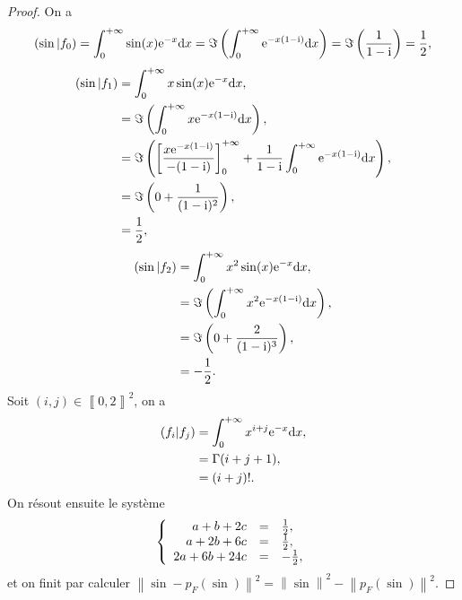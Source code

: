 \documentclass[12pt]{article}
\begin{document}
\begin{proof}
	On a 
	\begin{equation}
		(\sin|f_0)=\int_{0}^{+\infty}\sin(x)\mathrm{e}^{-x}\mathrm{d} x=\Im\left(\int_{0}^{+\infty}\mathrm{e}^{-x(1-\mathrm{i})}\mathrm{d} x\right)=\Im\left(\frac{1}{1-\mathrm{i}}\right)=\frac{1}{2},
	\end{equation}
	\begin{align}
		(\sin|f_1)
		&=\int_{0}^{+\infty}x\sin(x)\mathrm{e}^{-x}\mathrm{d} x,\\
		&=\Im\left(\int_{0}^{+\infty}x\mathrm{e}^{-x(1-\mathrm{i})}\mathrm{d} x\right),\\
		&=\Im\left(\left[\frac{x\mathrm{e}^{-x(1-\mathrm{i})}}{-(1-\mathrm{i})}\right]_{0}^{+\infty}+\frac{1}{1-\mathrm{i}}\int_{0}^{+\infty}\mathrm{e}^{-x(1-\mathrm{i})}\mathrm{d} x\right),\\
		&=\Im\left(0+\frac{1}{(1-\mathrm{i})^{2}}\right),\\
		&=\frac{1}{2},
	\end{align}
	\begin{align}
		(\sin|f_2)
		&=\int_{0}^{+\infty}x^{2}\sin(x)\mathrm{e}^{-x}\mathrm{d} x,\\
		&=\Im\left(\int_{0}^{+\infty}x^{2}\mathrm{e}^{-x(1-\mathrm{i})}\mathrm{d} x\right),\\
		&=\Im\left(0+\frac{2}{(1-\mathrm{i})^{3}}\right),\\
		&=-\frac{1}{2}.
	\end{align}
	Soit $(i,j)\in\left\llbracket0,2\right\rrbracket^{2}$, on a 
	\begin{align}
		(f_i|f_j)
		&=\int_{0}^{+\infty}x^{i+j}\mathrm{e}^{-x}\mathrm{d} x,\\
		&=\Gamma(i+j+1),\\
		&=(i+j)!.
	\end{align}
	On résout ensuite le système 
	\begin{equation}
		\left\lbrace
			\begin{array}[]{rcl}
				a+b+2c &=&\frac{1}{2},\\
				a+2b+6c &=& \frac{1}{2},\\
				2a+6b+24c &=& -\frac{1}{2},
			\end{array}
		\right.
	\end{equation}
	et on finit par calculer $\left\lVert\sin-p_F(\sin)\right\rVert^{2}=\left\lVert\sin\right\rVert^{2}-\left\lVert p_F(\sin)\right\rVert^{2}$.
\end{proof}
\end{document}
